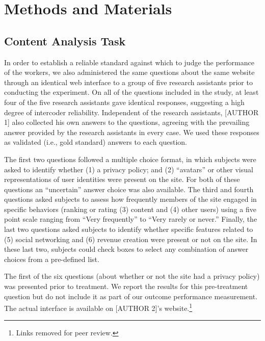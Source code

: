 \documentclass{chi2009}
\begin{document}
\section{Methods and Materials}

\subsection{Content Analysis Task}

In order to establish a reliable standard against which to judge the
performance of the workers, we also administered the same questions
about the same website through an identical web interface to a group
of five research assistants prior to conducting the experiment. On all
of the questions included in the study, at least four of the five
research assistants gave identical responses, suggesting a high degree
of intercoder reliability. Independent of the research assistants,
[AUTHOR 1] also collected his own answers to the questions, agreeing
with the prevailing answer provided by the research assistants in
every case. We used these responses as validated (i.e., gold standard)
answers to each question.

The first two questions followed a multiple choice format, in which
subjects were asked to identify whether (1) a privacy policy; and (2)
``avatars'' or other visual representations of user identities were
present on the site. For both of these questions an ``uncertain''
answer choice was also available. The third and fourth questions asked
subjects to assess how frequently members of the site engaged in
specific behaviors (ranking or rating (3) content and (4) other users)
using a five point scale ranging from ``Very frequently'' to ``Very
rarely or never.''  Finally, the last two questions asked subjects to
identify whether specific features related to (5) social networking
and (6) revenue creation were present or not on the site. In these
last two, subjects could check boxes to select any combination of
answer choices from a pre-defined list.

The first of the six questions (about whether or not the site had a
privacy policy) was presented prior to treatment. We report the
results for this pre-treatment question but do not include it as part
of our outcome performance measurement.  The actual interface is
available on [AUTHOR 2]'s website.\footnote{Links removed for peer
  review.
}
\end{document}
